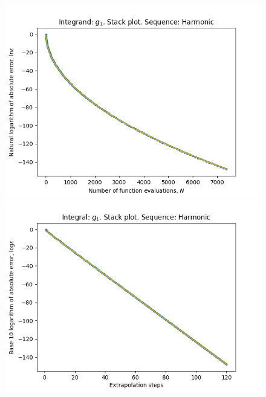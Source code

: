 \begin{figure}[H]
\centering
\begin{minipage}{0.45\textwidth}
\centering
\includegraphics[scale=0.45]{../results/romberg_plots/g_one_hp_harmonic_stack.png}
\end{minipage}
\begin{minipage}{0.45\textwidth}
\centering
\includegraphics[scale=0.45]{../results/romberg_plots/g_one_hp_harmonic_steps_stack.png}
\end{minipage}
\end{figure}

